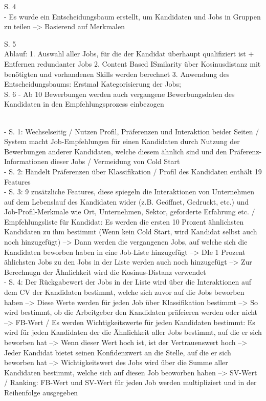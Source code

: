 S. 4\\
- Es wurde ein Entscheidungsbaum erstellt, um Kandidaten und Jobs in Gruppen zu teilen --> Basierend auf Merkmalen

S. 5\\
Ablauf:
1. Auswahl aller Jobs, für die der Kandidat überhaupt qualifiziert ist + Entfernen redundanter Jobs
2. Content Based ISmilarity über Kosinusdistanz mit benötigten und vorhandenen Skills werden berechnet
3. Anwendung des Entscheidungsbaums: Erstmal Kategorisierung der Jobs; \\

S. 6
- Ab 10 Bewerbungen werden auch vergangene Bewerbungsdaten des Kandidaten in den Empfehlungsprozess einbezogen

\textcite{oezcan:2016}\\
- S. 1: Wechselseitig / Nutzen Profil, Präferenzen und Interaktion beider Seiten / System macht Job-Empfehlungen für einen Kandidaten durch Nutzung der Bewerbungen anderer Kandidaten, welche diesem ähnlich sind und den Präferenz-Informationen dieser Jobs / Vermeidung von Cold Start\\
- S. 2: Händelt Präferenzen über Klassifikation / Profil des Kandidaten enthält 19 Features\\
- S. 3: 9 zusätzliche Features, diese spiegeln die Interaktionen von Unternehmen auf dem Lebenslauf des Kandidaten wider (z.B. Geöffnet, Gedruckt, etc.) und Job-Profil-Merkmale wie Ort, Unternehmen, Sektor, geforderte Erfahrung etc. / Empfehlungsliste für Kandidat: Es werden die ersten 10 Prozent ähnlichsten Kandidaten zu ihm bestimmt (Wenn kein Cold Start, wird Kandidat selbst auch noch hinzugefügt) --> Dann werden die vergangenen Jobs, auf welche sich die Kandidaten beworben haben in eine Job-Liste hinzugefügt --> DIe 1 Prozent ählichsten Jobs zu den Jobs in der Liste werden auch noch hinzugefügt --> Zur Berechnugn der Ähnlichkeit wird die Kosinus-Distanz verwendet\\
- S. 4: Der Rückgabewert der Jobs in der Liste wird über die Interaktionen auf dem CV der Kandidaten bestimmt, welche sich zuvor auf die Jobs beworben haben --> Diese Werte werden für jeden Job über Klassifikation bestimmt --> So wird bestimmt, ob die Arbeitgeber den Kandidaten präfeieren werden oder nicht --> FB-Wert / Es werden Wichtigkeitswerte für jeden Kandidaten bestimmt: Es wird für jeden Kandidaten der die Ähnlichkeit aller Jobs bestimmt, auf die er sich beworben hat --> Wenn dieser Wert hoch ist, ist der Vertrauenswert hoch --> Jeder Kandidat bietet seinen Konfidenzwert an die Stelle, auf die er sich beworben hat --> Wichtigkeitswert des Jobs wird über die Summe aller Kandidaten bestimmt, welche sich auf diesen Job beoworben haben --> SV-Wert / Ranking: FB-Wert und SV-Wert für jeden Job werden multipliziert und in der Reihenfolge ausgegeben

